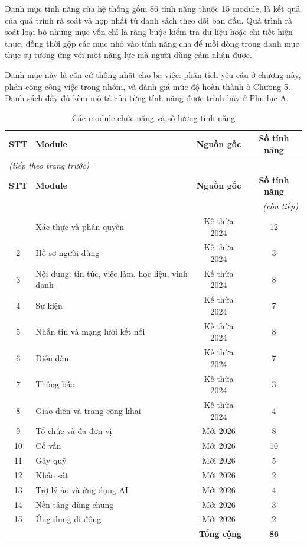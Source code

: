 \documentclass[12pt,a4paper,oneside]{report}
\begin{document}
Danh mục tính năng của hệ thống gồm 86 tính năng thuộc 15 module, là kết quả của quá trình rà soát và hợp nhất từ danh sách theo dõi ban đầu. Quá trình rà soát loại bỏ những mục vốn chỉ là ràng buộc kiểm tra dữ liệu hoặc chi tiết hiện thực, đồng thời gộp các mục nhỏ vào tính năng cha để mỗi dòng trong danh mục thực sự tương ứng với một năng lực mà người dùng cảm nhận được.

Danh mục này là căn cứ thống nhất cho ba việc: phân tích yêu cầu ở chương này, phân công công việc trong nhóm, và đánh giá mức độ hoàn thành ở Chương 5. Danh sách đầy đủ kèm mô tả của từng tính năng được trình bày ở Phụ lục A.

\renewcommand{\arraystretch}{1.25}
{\small
\begin{longtable}{|c|>{\raggedright\arraybackslash}p{7.6cm}|c|c|}
\caption{Các module chức năng và số lượng tính năng}\label{tab:modules}\\
\hline \textbf{STT} & \textbf{Module} & \textbf{Nguồn gốc} & \textbf{Số tính năng} \\ \hline
\endfirsthead
\multicolumn{4}{l}{\itshape\small (tiếp theo trang trước)}\\[2pt]
\hline \textbf{STT} & \textbf{Module} & \textbf{Nguồn gốc} & \textbf{Số tính năng} \\ \hline
\endhead
\hline \multicolumn{4}{r}{\itshape\small (còn tiếp)}\\
\endfoot
\hline
\endlastfoot
1 & Xác thực và phân quyền & Kế thừa 2024 & 12 \\ \hline
2 & Hồ sơ người dùng & Kế thừa 2024 & 3 \\ \hline
3 & Nội dung: tin tức, việc làm, học liệu, vinh danh & Kế thừa 2024 & 8 \\ \hline
4 & Sự kiện & Kế thừa 2024 & 7 \\ \hline
5 & Nhắn tin và mạng lưới kết nối & Kế thừa 2024 & 8 \\ \hline
6 & Diễn đàn & Kế thừa 2024 & 7 \\ \hline
7 & Thông báo & Kế thừa 2024 & 3 \\ \hline
8 & Giao diện và trang công khai & Kế thừa 2024 & 4 \\ \hline
9 & Tổ chức và đa đơn vị & Mới 2026 & 8 \\ \hline
10 & Cố vấn & Mới 2026 & 10 \\ \hline
11 & Gây quỹ & Mới 2026 & 5 \\ \hline
12 & Khảo sát & Mới 2026 & 2 \\ \hline
13 & Trợ lý ảo và ứng dụng AI & Mới 2026 & 4 \\ \hline
14 & Nền tảng dùng chung & Mới 2026 & 3 \\ \hline
15 & Ứng dụng di động & Mới 2026 & 2 \\ \hline
\multicolumn{3}{|r|}{\textbf{Tổng cộng}} & \textbf{86} \\ \hline
\end{longtable}
}
\renewcommand{\arraystretch}{1}
\end{document}

